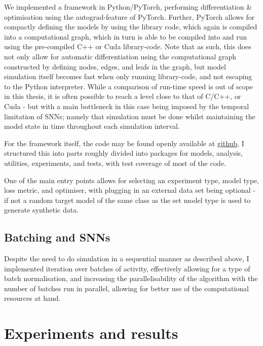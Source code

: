 \documentclass[mphil,deptreport,ianc]{infthesis} %
\begin{document}
We implemented a framework in Python/PyTorch, performing differentiation \& optimisation using the autograd-feature of PyTorch.
Further, PyTorch allows for compactly defining the models by using the library code, which again is compiled into a computational graph, which in turn is able to be compiled into and run using the pre-compiled C++ or Cuda library-code.
Note that as such, this does not only allow for automatic differentiation using the computational graph constructed by defining nodes, edges, and leafs in the graph, but model simulation itself becomes fast when only running library-code, and not escaping to the Python interpreter.
While a comparison of run-time speed is out of scope in this thesis, it is often possible to reach a level close to that of C/C++, or Cuda - but with a main bottleneck in this case being imposed by the temporal limitation of SNNs; namely that simulation must be done whilst maintaining the model state in time throughout each simulation interval.

For the framework itself, the code may be found openly available at \href{https://github.com/williampeer/snn_inference}{github}, I structured this into parts roughly divided into packages for models, analysis, utilities, experiments, and tests, with test coverage of most of the code.

One of the main entry points allows for selecting an experiment type, model type, loss metric, and optimiser, with plugging in an external data set being optional - if not a random target model of the same class as the set model type is used to generate synthetic data.


\subsection{Batching and SNNs}

Despite the need to do simulation in a sequential manner as described above, I implemented iteration over batches of activity, effectively allowing for a type of batch normalisation, and increasing the parallelisability of the algorithm with the number of batches run in parallel, allowing for better use of the computational resources at hand.


\section{Experiments and results}
\end{document}
